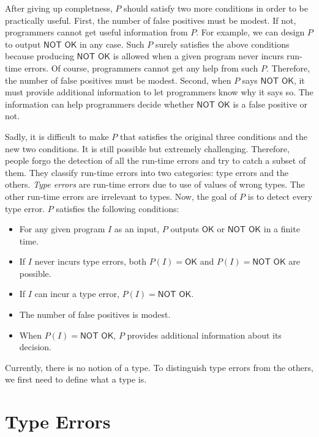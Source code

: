 After giving up completness, $P$ should satisfy two more conditions in order to
be practically useful. First, the number of false positives must be modest. If not,
programmers cannot get useful information from $P$. For example, we can design
$P$ to output $\textsf{NOT OK}$ in any case. Such $P$ surely satisfies the above
conditions because producing $\textsf{NOT OK}$ is allowed when a given program
never incurs run-time errors. Of course, programmers cannot get any help from
such $P$. Therefore, the number of false positives must be modest. Second, when
$P$ says $\textsf{NOT OK}$, it must provide additional information to let
programmers know why it says so. The information can help programmers decide
whether $\textsf{NOT OK}$ is a false positive or not.

Sadly, it is difficult to make $P$ that satisfies the original three conditions
and the new two conditions. It is still possible but extremely challenging.
Therefore, people forgo the detection of all the run-time errors and try to
catch a subset of them. They
classify run-time errors into two categories: type errors and the
others. \textit{Type errors} are run-time errors due to use of
values of wrong types. The other run-time errors are irrelevant to types.
Now, the goal of $P$ is to detect every type error. $P$ satisfies the following
conditions:
\begin{itemize}
  \item For any given program $I$ as an input, $P$ outputs $\textsf{OK}$ or
    $\textsf{NOT OK}$ in a finite time.
  \item If $I$ never incurs type errors,
    both $P(I)=\textsf{OK}$ and $P(I)=\textsf{NOT OK}$ are possible.
  \item If $I$ can incur a type error, $P(I)=\textsf{NOT OK}$.
  \item The number of false positives is modest.
  \item When $P(I)=\textsf{NOT OK}$, $P$ provides additional information about
    its decision.
\end{itemize}
Currently, there is no notion of a type. To distinguish type errors from the
others, we first need to define what a type is.

\section{Type Errors}

